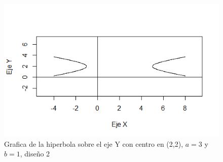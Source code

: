 \documentclass[12pt,a4paper]{article} %
\begin{document}
\begin{figure}
\centering
\includegraphics[scale=0.75]{Hiperbola3.png}
\caption{Grafica de la hiperbola sobre el eje Y con centro en (2,2), $a = 3$ y $b = 1$, diseño 2}
\end{figure}



\end{document}
